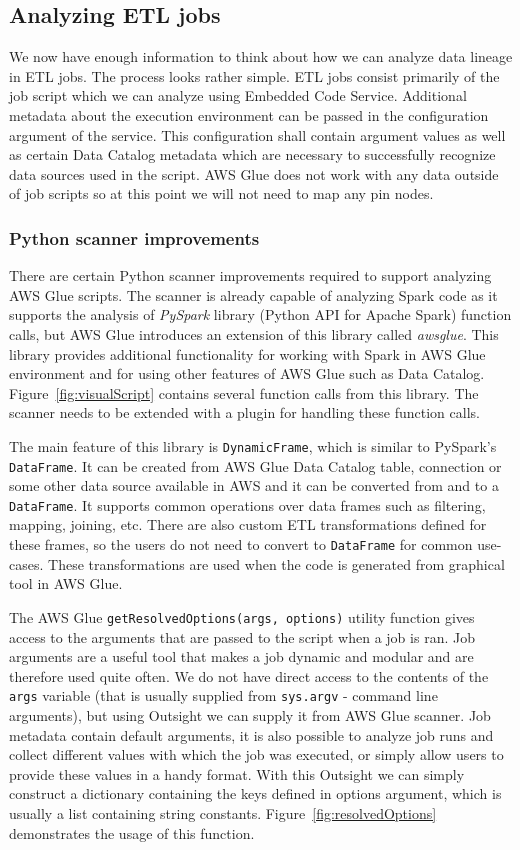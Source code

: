 \subsection{Analyzing ETL jobs}
We now have enough information to think about how we can analyze data lineage in ETL jobs. The process looks rather simple. ETL jobs consist primarily of the job script which we can analyze using Embedded Code Service. Additional metadata about the execution environment can be passed in the configuration argument of the service. This configuration shall contain argument values as well as certain Data Catalog metadata which are necessary to successfully recognize data sources used in the script. AWS Glue does not work with any data outside of job scripts so at this point we will not need to map any pin nodes.

\subsubsection{Python scanner improvements}
There are certain Python scanner improvements required to support analyzing AWS Glue scripts. The scanner is already capable of analyzing Spark code as it supports the analysis of \textit{PySpark} library (Python API for Apache Spark) function calls, but AWS Glue introduces an extension of this library called \textit{awsglue}. This library provides additional functionality for working with Spark in AWS Glue environment and for using other features of AWS Glue such as Data Catalog. Figure~\ref{fig:visualScript} contains several function calls from this library. The scanner needs to be extended with a plugin for handling these function calls.
\par
The main feature of this library is \texttt{DynamicFrame}, which is similar to PySpark's \texttt{DataFrame}. It can be created from AWS Glue Data Catalog table, connection or some other data source available in AWS and it can be converted from and to a \texttt{DataFrame}. It supports common operations over data frames such as filtering, mapping, joining, etc. There are also custom ETL transformations defined for these frames, so the users do not need to convert to \texttt{DataFrame} for common use-cases. These transformations are used when the code is generated from graphical tool in AWS Glue.
\par
The AWS Glue \texttt{getResolvedOptions(args, options)} utility function gives access to the arguments that are passed to the script when a job is ran. Job arguments are a useful tool that makes a job dynamic and modular and are therefore used quite often. We do not have direct access to the contents of the \texttt{args} variable (that is usually supplied from \texttt{sys.argv} - command line arguments), but using Outsight we can supply it from AWS Glue scanner. Job metadata contain default arguments, it is also possible to analyze job runs and collect different values with which the job was executed, or simply allow users to provide these values in a handy format. With this Outsight we can simply construct a dictionary containing the keys defined in options argument, which is usually a list containing string constants. Figure~\ref{fig:resolvedOptions} demonstrates the usage of this function.
